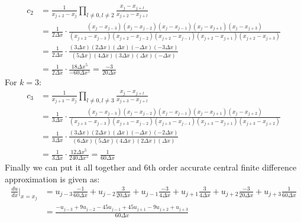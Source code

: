 \begin{equation}
	\begin{aligned}
		c_{2} & = \frac{1}{x_{j+2} - x_j} \prod_{l \neq 0, l \neq 2} \frac{x_j - x_{j+l}}{x_{j+2} - x_{j+l}}                                                                                                                    \\
		      & = \frac{1}{2\Delta x} \cdot \frac{(x_j - x_{j-3})(x_j - x_{j-2})(x_j - x_{j-1})(x_j - x_{j+1})(x_j - x_{j+3})}{(x_{j+2} - x_{j-3})(x_{j+2} - x_{j-2})(x_{j+2} - x_{j-1})(x_{j+2} - x_{j+1})(x_{j+2} - x_{j+3})} \\
		      & = \frac{1}{2\Delta x} \cdot \frac{(3\Delta x)(2\Delta x)(\Delta x)(-\Delta x)(-3\Delta x)}{(5\Delta x)(4\Delta x)(3\Delta x)(\Delta x)(-\Delta x)}                                                                 \\
		      & = \frac{1}{2\Delta x} \cdot \frac{18 \Delta x^5}{-60 \Delta x^5} = \frac{-3}{20\Delta x}
	\end{aligned}
\end{equation}
For $k = 3$:
\begin{equation}
	\begin{aligned}
		c_{3} & = \frac{1}{x_{j+3} - x_j} \prod_{l \neq 0, l \neq 3} \frac{x_j - x_{j+l}}{x_{j+3} - x_{j+l}}                                                                                                                    \\
		      & = \frac{1}{3\Delta x} \cdot \frac{(x_j - x_{j-3})(x_j - x_{j-2})(x_j - x_{j-1})(x_j - x_{j+1})(x_j - x_{j+2})}{(x_{j+3} - x_{j-3})(x_{j+3} - x_{j-2})(x_{j+3} - x_{j-1})(x_{j+3} - x_{j+1})(x_{j+3} - x_{j+2})} \\
		      & = \frac{1}{3\Delta x} \cdot \frac{(3\Delta x)(2\Delta x)(\Delta x)(-\Delta x)(-2\Delta x)}{(6\Delta x)(5\Delta x)(4\Delta x)(2\Delta x)(\Delta x)}                                                                \\
		      & = \frac{1}{3\Delta x} \cdot \frac{12 \Delta x^5}{240 \Delta x^5} = \frac{1}{60\Delta x}
	\end{aligned}
\end{equation}
Finally we can put it all together and 6th order accurate central finite difference approximation is given as:
\begin{equation}
	\begin{aligned}
		\frac{du}{dx} \bigg\vert_{x=x_j} &= u_{j-3} \frac{-1}{60\Delta x} +  u_{j-2} \frac{3}{20\Delta x} + u_{j-1} \frac{-3}{4\Delta x} + u_{j+1} \frac{3}{4\Delta x} + u_{j+2} \frac{-3}{20\Delta x} + u_{j+3}  \frac{1}{60\Delta x}\\
		&= \frac{-u_{j-3} + 9u_{j-2} - 45u_{j-1} + 45u_{j+1} - 9u_{j+2} + u_{j+3} }{60 \Delta x}
	\end{aligned}
	\label{eq:final}
\end{equation}



